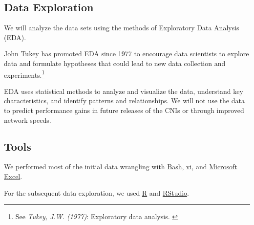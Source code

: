 \subsection{Data Exploration}

We will analyze the data sets using the methods of Exploratory Data Analysis (EDA).

John Tukey has promoted EDA since 1977 to encourage data scientists to explore data and formulate hypotheses that could lead to new data collection and experiments.\footnote{See \textit{Tukey, J.W. (1977)}: Exploratory data analysis. \cite{exploratoryDA}}

EDA uses statistical methods to analyze and visualize the data, understand key characteristics, and identify patterns and relationships. We will not use the data to predict performance gains in future releases of the CNIs or through improved network speeds.

\subsection{Tools}

We performed most of the initial data wrangling with \href{https://www.gnu.org/software/bash/}{Bash}, \href{https://pubs.opengroup.org/onlinepubs/9699919799/utilities/vi.html}{vi}, and \href{https://www.microsoft.com/en-us/microsoft-365/excel}{Microsoft Excel}.

For the subsequent data exploration, we used \href{https://www.r-project.org/}{R} and \href{https://posit.co/download/rstudio-desktop/}{RStudio}.
